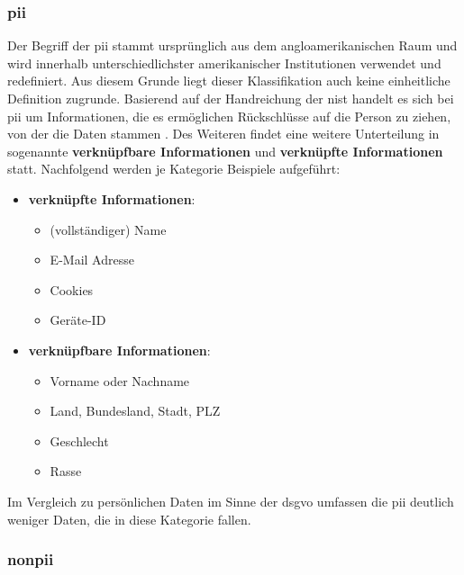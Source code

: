 \subsubsection{\acf{pii}}
\label{sec:Grundlagen:ssec:Klassifikation von Daten:sssec:PII}
Der Begriff der \ac{pii} stammt ursprünglich aus dem angloamerikanischen Raum und wird innerhalb unterschiedlichster amerikanischer Institutionen verwendet und redefiniert. Aus diesem Grunde liegt dieser Klassifikation auch keine einheitliche Definition zugrunde. Basierend auf der Handreichung der \ac{nist} handelt es sich bei \acs{pii} um Informationen, die es ermöglichen Rückschlüsse auf die Person zu ziehen, von der die Daten stammen \cite{PiwikPro2022,NIST2010}. Des Weiteren findet eine weitere Unterteilung in sogenannte \textbf{verknüpfbare Informationen} und \textbf{verknüpfte Informationen} statt. Nachfolgend werden je Kategorie Beispiele aufgeführt:

\begin{itemize}
	\item \textbf{verknüpfte Informationen}:
		\begin{itemize}
			\item (vollständiger) Name
			\item E-Mail Adresse
			\item Cookies
			\item Geräte-ID
		\end{itemize}
	\item \textbf{verknüpfbare Informationen}:
		\begin{itemize}
			\item Vorname oder Nachname
			\item Land, Bundesland, Stadt, PLZ
			\item Geschlecht
			\item Rasse
		\end{itemize}
\end{itemize}

Im Vergleich zu persönlichen Daten im Sinne der \ac{dsgvo} umfassen die \acs{pii} deutlich weniger Daten, die in diese Kategorie fallen.


\subsubsection{\acf{nonpii}}
\label{sec:Grundlagen:ssec:Klassifikation von Daten:sssec:Non-PII}


